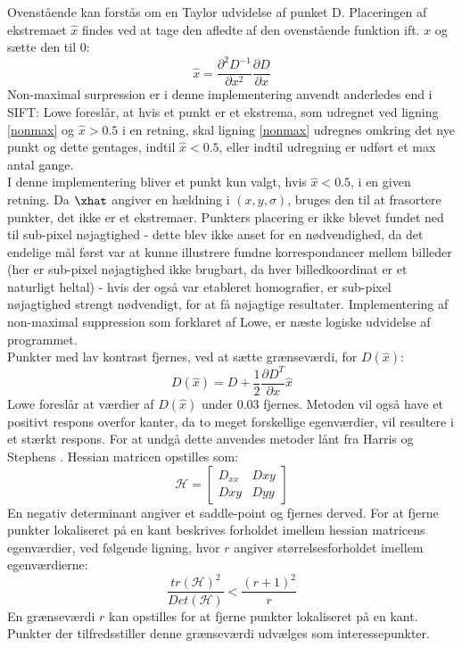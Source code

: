 Ovenstående kan forstås om en Taylor udvidelse af punket D.
Placeringen af ekstremaet $\hat{x}$ findes ved at tage den afledte af den ovenstående funktion ift. $x$ og sætte den til 0:
\begin{equation}
\hat{x}= \dfrac{\partial^2 D^{-1}}{\partial x^2}\dfrac{\partial D}{\partial x}
\label{xhat}
\end{equation}
Non-maximal surpression er i denne implementering anvendt anderledes end i SIFT: Lowe foreslår, at hvis et punkt er et ekstrema, som udregnet ved ligning \eqref{nonmax} og $\hat{x} > 0.5$ i en retning, skal ligning \eqref{nonmax} udregnes omkring det nye punkt og dette gentages, indtil $\hat{x} < 0.5$, eller indtil udregning er udført et max antal gange.
\\
I denne implementering bliver et punkt kun valgt, hvis $\hat{x} < 0.5$, i en given retning. Da $\xhat$ angiver en hældning i $(x, y, \sigma)$, bruges den til at frasortere punkter, det ikke er et ekstremaer. Punkters placering er ikke blevet fundet ned til sub-pixel nøjagtighed - dette blev ikke anset for en nødvendighed, da det endelige mål først var at kunne illustrere fundne korrespondancer mellem billeder (her er sub-pixel nøjagtighed ikke brugbart, da hver billedkoordinat er et naturligt heltal) - hvis der også var etableret homografier, er sub-pixel nøjagtighed strengt nødvendigt, for at få nøjagtige resultater. Implementering af non-maximal suppression som forklaret af Lowe, er næste logiske udvidelse af programmet. 
\\
Punkter med lav kontrast fjernes, ved at sætte grænseværdi, for $D(\hat{x})$:
\begin{equation}
D(\hat{x})=D+\dfrac{1}{2}\dfrac{\partial D^T}{\partial x}\hat{x}
\label{dxhat}
\end{equation}
Lowe foreslår at værdier af $D(\hat{x})$ under 0.03 fjernes. Metoden vil også have et positivt respons overfor kanter, da to meget forskellige egenværdier, vil resultere i et stærkt respons.
For at undgå dette anvendes metoder lånt fra Harris og Stephens \cite{harris}. Hessian matricen opstilles som:
\begin{equation}
\mathcal{H} =
\begin{bmatrix}
D_{xx} & D{xy} \\
D{xy} & D{yy}
\end{bmatrix}
\end{equation}
En negativ determinant angiver et saddle-point og fjernes derved. For at fjerne punkter lokaliseret på en kant beskrives forholdet imellem hessian matricens egenværdier, ved følgende ligning, hvor $r$ angiver størrelsesforholdet imellem egenværdierne:
\begin{equation}
\dfrac{tr(\mathcal{H})^2}{Det(\mathcal{H})}<\dfrac{(r+1)^2}{r}
\label{rval}
\end{equation}
En grænseværdi $r$ kan opstilles for at fjerne punkter lokaliseret på en kant. Punkter der tilfredsstiller denne grænseværdi udvælges som interessepunkter.
